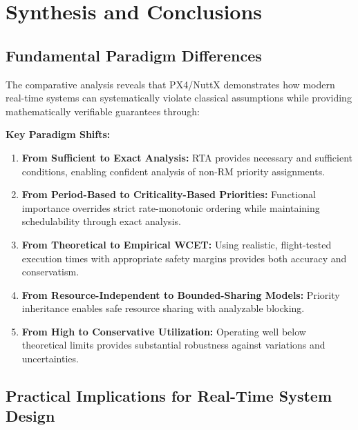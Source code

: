 \documentclass[12pt,a4paper]{article}
\begin{document}
\section{Synthesis and Conclusions}

\subsection{Fundamental Paradigm Differences}

The comparative analysis reveals that PX4/NuttX demonstrates how modern real-time systems can systematically violate classical assumptions while providing mathematically verifiable guarantees through:

\textbf{Key Paradigm Shifts:}
\begin{enumerate}
\item \textbf{From Sufficient to Exact Analysis:} RTA provides necessary and sufficient conditions, enabling confident analysis of non-RM priority assignments.

\item \textbf{From Period-Based to Criticality-Based Priorities:} Functional importance overrides strict rate-monotonic ordering while maintaining schedulability through exact analysis.

\item \textbf{From Theoretical to Empirical WCET:} Using realistic, flight-tested execution times with appropriate safety margins provides both accuracy and conservatism.

\item \textbf{From Resource-Independent to Bounded-Sharing Models:} Priority inheritance enables safe resource sharing with analyzable blocking.

\item \textbf{From High to Conservative Utilization:} Operating well below theoretical limits provides substantial robustness against variations and uncertainties.
\end{enumerate}

\subsection{Practical Implications for Real-Time System Design}
\end{document}
